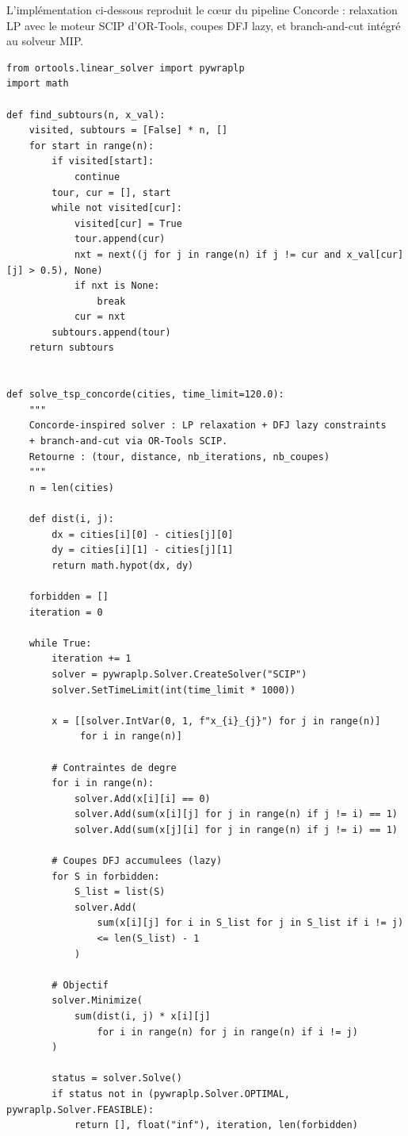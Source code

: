 \documentclass[12pt, a4paper]{article}
\begin{document}
L'implémentation ci-dessous reproduit le cœur du pipeline Concorde :
relaxation LP avec le moteur SCIP d'OR-Tools, coupes DFJ lazy, et
branch-and-cut intégré au solveur MIP.

\begin{lstlisting}[caption={Concorde-inspired : LP + DFJ lazy + branch-and-cut (OR-Tools SCIP)}]
from ortools.linear_solver import pywraplp
import math

def find_subtours(n, x_val):
    visited, subtours = [False] * n, []
    for start in range(n):
        if visited[start]:
            continue
        tour, cur = [], start
        while not visited[cur]:
            visited[cur] = True
            tour.append(cur)
            nxt = next((j for j in range(n) if j != cur and x_val[cur][j] > 0.5), None)
            if nxt is None:
                break
            cur = nxt
        subtours.append(tour)
    return subtours


def solve_tsp_concorde(cities, time_limit=120.0):
    """
    Concorde-inspired solver : LP relaxation + DFJ lazy constraints
    + branch-and-cut via OR-Tools SCIP.
    Retourne : (tour, distance, nb_iterations, nb_coupes)
    """
    n = len(cities)

    def dist(i, j):
        dx = cities[i][0] - cities[j][0]
        dy = cities[i][1] - cities[j][1]
        return math.hypot(dx, dy)

    forbidden = []
    iteration = 0

    while True:
        iteration += 1
        solver = pywraplp.Solver.CreateSolver("SCIP")
        solver.SetTimeLimit(int(time_limit * 1000))

        x = [[solver.IntVar(0, 1, f"x_{i}_{j}") for j in range(n)]
             for i in range(n)]

        # Contraintes de degre
        for i in range(n):
            solver.Add(x[i][i] == 0)
            solver.Add(sum(x[i][j] for j in range(n) if j != i) == 1)
            solver.Add(sum(x[j][i] for j in range(n) if j != i) == 1)

        # Coupes DFJ accumulees (lazy)
        for S in forbidden:
            S_list = list(S)
            solver.Add(
                sum(x[i][j] for i in S_list for j in S_list if i != j)
                <= len(S_list) - 1
            )

        # Objectif
        solver.Minimize(
            sum(dist(i, j) * x[i][j]
                for i in range(n) for j in range(n) if i != j)
        )

        status = solver.Solve()
        if status not in (pywraplp.Solver.OPTIMAL, pywraplp.Solver.FEASIBLE):
            return [], float("inf"), iteration, len(forbidden)


\end{lstlisting}
\end{document}
